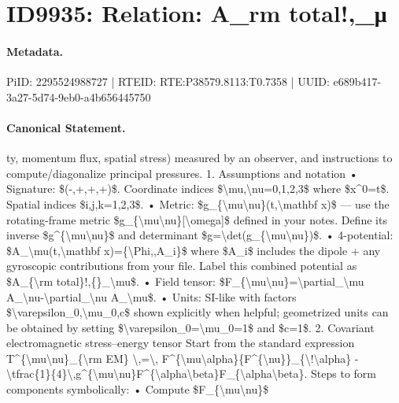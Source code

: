 \section*{ID9935: Relation: A\_rm total!,\_μ}
\paragraph{Metadata.}
PiID: 2295524988727 | RTEID: RTE:P38579.8113:T0.7358 | UUID: e689b417-3a27-5d74-9eb0-a4b656445750

\paragraph{Canonical Statement.}
ty, momentum flux, spatial stress) measured by an observer, and instructions to compute/diagonalize principal pressures. 1. Assumptions and notation • Signature: \$(-,+,+,+)\$. Coordinate indices \$\textbackslash{}mu,\textbackslash{}nu=0,1,2,3\$ where \$x\textasciicircum{}0=t\$. Spatial indices \$i,j,k=1,2,3\$. • Metric: \$g\_\{\textbackslash{}mu\textbackslash{}nu\}(t,\textbackslash{}mathbf x)\$ — use the rotating-frame metric \$g\_\{\textbackslash{}mu\textbackslash{}nu\}[\textbackslash{}omega]\$ defined in your notes. Define its inverse \$g\textasciicircum{}\{\textbackslash{}mu\textbackslash{}nu\}\$ and determinant \$g=\textbackslash{}det(g\_\{\textbackslash{}mu\textbackslash{}nu\})\$. • 4-potential: \$A\_\textbackslash{}mu(t,\textbackslash{}mathbf x)=\{\textbackslash{}Phi,,A\_i\}\$ where \$A\_i\$ includes the dipole + any gyroscopic contributions from your file. Label this combined potential as \$A\_\{\textbackslash{}rm total\}!,\{\}\_\textbackslash{}mu\$. • Field tensor: \$F\_\{\textbackslash{}mu\textbackslash{}nu\}=\textbackslash{}partial\_\textbackslash{}mu A\_\textbackslash{}nu-\textbackslash{}partial\_\textbackslash{}nu A\_\textbackslash{}mu\$. • Units: SI-like with factors \$\textbackslash{}varepsilon\_0,\textbackslash{}mu\_0,c\$ shown explicitly when helpful; geometrized units can be obtained by setting \$\textbackslash{}varepsilon\_0=\textbackslash{}mu\_0=1\$ and \$c=1\$. 2. Covariant electromagnetic stress–energy tensor Start from the standard expression T\textasciicircum{}\{\textbackslash{}mu\textbackslash{}nu\}\_\{\textbackslash{}rm EM\} \textbackslash{},=\textbackslash{}, F\textasciicircum{}\{\textbackslash{}mu\textbackslash{}alpha\}\{F\textasciicircum{}\{\textbackslash{}nu\}\}\_\{\textbackslash{}!\textbackslash{}alpha\} - \textbackslash{}tfrac\{1\}\{4\}\textbackslash{},g\textasciicircum{}\{\textbackslash{}mu\textbackslash{}nu\}F\textasciicircum{}\{\textbackslash{}alpha\textbackslash{}beta\}F\_\{\textbackslash{}alpha\textbackslash{}beta\}. Steps to form components symbolically: • Compute \$F\_\{\textbackslash{}mu\textbackslash{}nu\}\$

